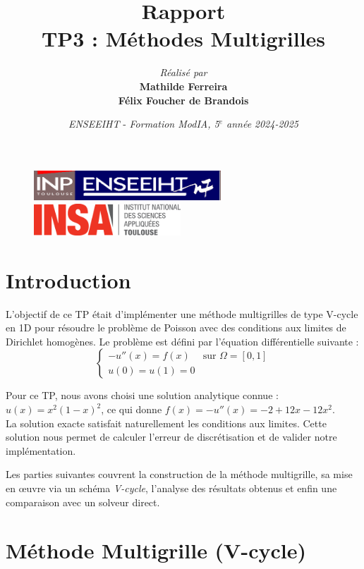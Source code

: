 \documentclass[12pt,a4paper]{article}
\title{\vspace{4cm}
        Rapport \\
        \vspace{1cm} \textbf{TP3 : Méthodes Multigrilles} \\ 
        \vspace{4cm} 
}
\author{\textit{Réalisé par} \vspace{0.5cm}\\
         \textbf{Mathilde Ferreira} \\
        \textbf{Félix Foucher de Brandois}
}
\date{\vfill
        \textit{ENSEEIHT} - 
        \textit{Formation ModIA, 5$^{e}$ année}
        \hfill
        \textit{2024-2025} \\
        \vspace{1cm}
}
\begin{document}
\begin{figure}[t]
    \centering
    \includegraphics[width=7cm]{src/inp_n7.png}
    \hfill
    \includegraphics[width=5.5cm]{src/insa_toulouse.png}
\end{figure}


\maketitle
\thispagestyle{empty}

\newpage


\section{Introduction}

L'objectif de ce TP était d'implémenter une méthode multigrilles de type V-cycle en 1D pour résoudre le problème de Poisson avec des conditions aux limites de Dirichlet homogènes.
Le problème est défini par l'équation différentielle suivante :
\begin{equation}
    \begin{cases}
        -u''(x) = f(x) & \text{sur } \Omega = [0, 1] \\
        u(0) = u(1) = 0
    \end{cases}
\end{equation}

Pour ce TP, nous avons choisi une solution analytique connue : $u(x) = x^2(1 - x)^2$, ce qui donne $f(x) = -u''(x) = -2 + 12x - 12x^2$. \\
La solution exacte satisfait naturellement les conditions aux limites.
Cette solution nous permet de calculer l'erreur de discrétisation et de valider notre implémentation.

Les parties suivantes couvrent la construction de la méthode multigrille, sa mise en œuvre via un schéma \textit{V-cycle}, l’analyse des résultats obtenus et enfin une comparaison avec un solveur direct.

\section{Méthode Multigrille (V-cycle)}
\end{document}
